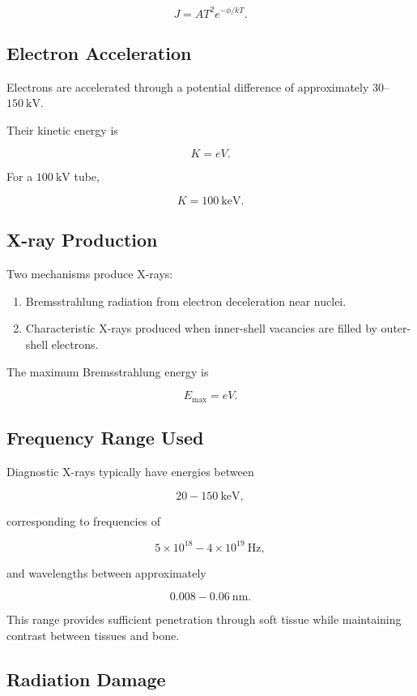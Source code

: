\documentclass[12pt]{article}
\begin{document}
\[
J=AT^2e^{-\phi/kT}.
\]

\subsection*{Electron Acceleration}

Electrons are accelerated through a potential difference of approximately $30$--$150~\mathrm{kV}$.

Their kinetic energy is

\[
K=eV.
\]

For a $100~\mathrm{kV}$ tube,

\[
K=100~\mathrm{keV}.
\]

\subsection*{X-ray Production}

Two mechanisms produce X-rays:

\begin{enumerate}
\item Bremsstrahlung radiation from electron deceleration near nuclei.
\item Characteristic X-rays produced when inner-shell vacancies are filled by outer-shell electrons.
\end{enumerate}

The maximum Bremsstrahlung energy is

\[
E_{\max}=eV.
\]

\subsection*{Frequency Range Used}

Diagnostic X-rays typically have energies between

\[
20-150~\mathrm{keV},
\]

corresponding to frequencies of

\[
5\times10^{18}
-
4\times10^{19}\ \mathrm{Hz},
\]

and wavelengths between approximately

\[
0.008-0.06~\mathrm{nm}.
\]

This range provides sufficient penetration through soft tissue while maintaining contrast between tissues and bone.

\subsection*{Radiation Damage}
\end{document}
